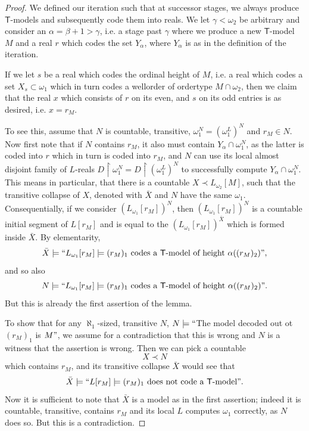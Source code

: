 \documentclass[a4paper,12pt]{article}
\newcommand{\T}{\mathsf{T}}
\begin{document}
\begin{proof}
We defined our iteration such that at successor stages, we always produce $\T$-models and subsequently code them into reals. We let $\gamma < \omega_2$ be arbitrary and consider an $\alpha=\beta+1 > \gamma$, i.e. a stage past $\gamma$ where we produce a new $\T$-model $M$ and a real $r$ which codes the set $Y_{\alpha}$, where $Y_{\alpha}$ is as in the definition of the iteration.

If we let $s$ be a real which codes the ordinal height of $M$, i.e. a real which codes a set $X_s \subset \omega_1$ which in turn codes a wellorder of ordertype $M \cap \omega_2$, then we claim that the real $x$ which consists of $r$ on its even, and $s$ on its odd entries is as desired, i.e. $x=r_M$.

To see this, assume that $N$ is countable, transitive, $\omega_1^N=(\omega_1^L)^N$ and $r_M \in N$.
Now first note that if $N$ contains $r_M$, it also must contain $Y_{\alpha} \cap \omega_1^N$, as the latter is coded into $r$ which in turn is coded into $r_M$, and $N$ can use its local almost disjoint family of $L$-reals $D \upharpoonright \omega_1^N=D \upharpoonright (\omega_1^L)^N$ to successfully compute $Y_{\alpha} \cap \omega_1^N$. 
This means in particular, that there is a countable $X \prec L_{\omega_2}[M]$, such that the transitive collapse of $X$, denoted with $\bar{X}$ and $N$ have the same $\omega_1$.
Consequentially, if  we consider $(L_{\omega_1}[r_M])^N$, then $(L_{\omega_1}[r_M])^N$ is a countable initial segment of $L[r_M]$ and is equal to the $(L_{\omega_1}[r_M])^{\bar{X}}$ which is formed inside $\bar{X}$. By elementarity, \[ \bar{X} \models ``L_{\omega_1}[r_M] \models \text{$(r_M)_1$ codes a $\T$-model of height } \alpha((r_M)_2)", \] and so also
\[ N \models ``L_{\omega_1}[r_M] \models (r_M)_1 \text{ codes a $\T$-model of height }\alpha((r_M)_2)" .\]
But this is already the first assertion of the lemma.

To show that for any $\aleph_1$-sized, transitive $N$, $N\models ``$The model decoded out ot $(r_M)_1$ is $M"$, we assume for a contradiction that this is wrong and $N$ is a witness that the assertion is wrong. Then we can pick a countable \[X \prec N\] which contains $r_M$, and its transitive collapse $\bar{X}$ would see that 
\[\bar{X} \models ``L[r_M] \models (r_M)_1 \text{ does not code a $\T$-model}". \] 
Now it is sufficient to note that $\bar{X}$ is a model as in the first assertion; indeed it is countable, transitive, contains $r_M$ and its local $L$ computes $\omega_1$ correctly, as $N$ does so. But this is a contradiction.
\end{proof}
\end{document}
